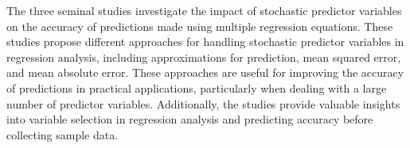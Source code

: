 The three seminal studies investigate the impact of stochastic predictor variables on the accuracy of predictions made using multiple regression equations. These studies propose different approaches for handling stochastic predictor variables in regression analysis, including approximations for prediction, mean squared error, and mean absolute error. These approaches are useful for improving the accuracy of predictions in practical applications, particularly when dealing with a large number of predictor variables. Additionally, the studies provide valuable insights into variable selection in regression analysis and predicting accuracy before collecting sample data. 
